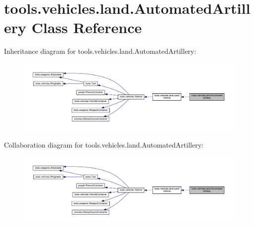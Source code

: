 \hypertarget{classtools_1_1vehicles_1_1land_1_1_automated_artillery}{}\section{tools.\+vehicles.\+land.\+Automated\+Artillery Class Reference}
\label{classtools_1_1vehicles_1_1land_1_1_automated_artillery}


Inheritance diagram for tools.\+vehicles.\+land.\+Automated\+Artillery\+:
\nopagebreak
\begin{figure}[H]
\begin{center}
\leavevmode
\includegraphics[width=350pt]{classtools_1_1vehicles_1_1land_1_1_automated_artillery__inherit__graph}
\end{center}
\end{figure}


Collaboration diagram for tools.\+vehicles.\+land.\+Automated\+Artillery\+:
\nopagebreak
\begin{figure}[H]
\begin{center}
\leavevmode
\includegraphics[width=350pt]{classtools_1_1vehicles_1_1land_1_1_automated_artillery__coll__graph}
\end{center}
\end{figure}
